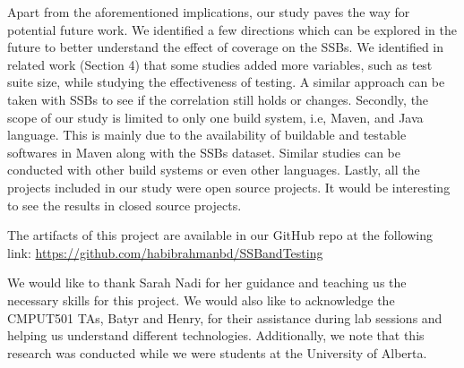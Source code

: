 \documentclass[sigconf,nonacm]{acmart}
\begin{document}
Apart from the aforementioned implications, our study paves the way for potential future work. We identified a few directions which can be explored in the future to better understand the effect of coverage on the SSBs. We identified in related work (Section 4) that some studies added more variables, such as test suite size, while studying the effectiveness of testing. A similar approach can be taken with SSBs to see if the correlation still holds or changes. Secondly, the scope of our study is limited to only one build system, i.e, Maven, and Java language. This is mainly due to the availability of buildable and testable softwares in Maven along with the SSBs dataset. Similar studies can be conducted with other build systems or even other languages. Lastly, all the projects included in our study were open source projects. It would be interesting to see the results in closed source projects.

The artifacts of this project are available in our GitHub repo at the following link:
\href{https://github.com/habibrahmanbd/SSBandTesting}{https://github.com/habibrahmanbd/SSBandTesting}

\begin{acks}
	We would like to thank Sarah Nadi for her guidance and teaching us the necessary skills for this project. We would also like to acknowledge the CMPUT501 TAs, Batyr and Henry, for their assistance during lab sessions and helping us understand different technologies. Additionally, we note that this research was conducted while we were students at the University of Alberta.
\end{acks}
\end{document}
